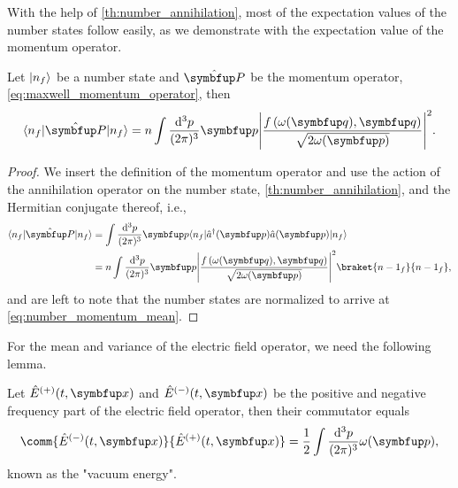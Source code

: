 With the help of \cref{th:number_annihilation}, most of the expectation values of the number states follow easily, as we demonstrate with the expectation value of the momentum operator.
\begin{theorem}
	Let $\lvert n_f\rangle$ be a number state and $\vu{P}$ be the momentum operator, \cref{eq:maxwell_momentum_operator}, then
	\begin{equation}
		\bra{n_f}
		\vu{P}
		\ket{n_f}
		=
		n
		\int\frac{\dd[3]{p}}{(2\pi)^3}
		\vb{p}
		\abs*{\frac{f\left(\omega(\vb{q}),\vb{q}\right)}{\sqrt{2\omega(\vb{p})}}}^2
		\label{eq:number_momentum_mean}
		.
	\end{equation}
\end{theorem}
\begin{proof}
	We insert the definition of the momentum operator and use the action of the annihilation operator on the number state, \cref{th:number_annihilation}, and the Hermitian conjugate thereof, i.e.,
	\begin{equation}
		\begin{split}
			\bra{n_f}
			\vu{P}
			\ket{n_f}
			&=
			\int\frac{\dd[3]{p}}{(2\pi)^3}
			\vb{p}
			\bra{n_f}
			\hat{a}^\dagger(\vb{p})
			\hat{a}(\vb{p})
			\ket{n_f}
			\\
			&=
			n
			\int\frac{\dd[3]{p}}{(2\pi)^3}
			\vb{p}
			\abs*{\frac{f\left(\omega(\vb{q}),\vb{q}\right)}{\sqrt{2\omega(\vb{p})}}}^2
			\braket{{n-1}_f}{{n-1}_f}
			,
		\end{split}
	\end{equation}
	and are left to note that the number states are normalized to arrive at \cref{eq:number_momentum_mean}.
\end{proof}
For the mean and variance of the electric field operator, we need the following lemma.
\begin{lemma}\label{th:comm_electric_field_equal}
	Let $\hat{E}^{(+)}(t,\vb{x})$ and $\hat{E}^{(-)}(t,\vb{x})$ be the positive and negative frequency part of the electric field operator, then their commutator equals
	\begin{equation}
		\comm{\hat{E}^{(-)}(t,\vb{x})}{\hat{E}^{(+)}(t,\vb{x})}
		=
		\frac{1}{2}
		\int\frac{\dd[3]{p}}{(2\pi)^3}
		\omega(\vb{p})
		,
	\end{equation}
	known as the "vacuum energy".
\end{lemma}
